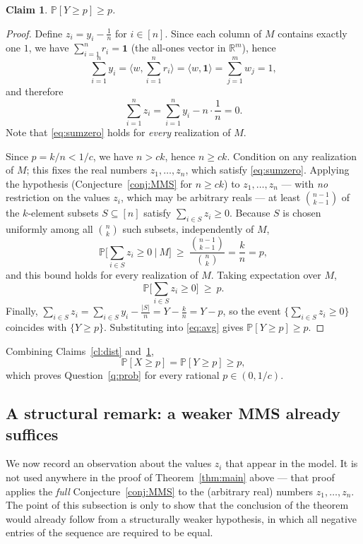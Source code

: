 \documentclass[11pt]{amsart}
\theoremstyle{plain}
\newtheorem{claim}[theorem]{Claim}
\theoremstyle{definition}
\def\bR{\mathbb{R}}
\def\Pb{\mathbb{P}}
\begin{document}
\begin{claim}\label{cl:bound}
$\Pb[Y\ge p]\ge p$.
\end{claim}

\begin{proof}
Define $z_i=y_i-\frac1n$ for $i\in[n]$. Since each column of $M$ contains exactly
one $1$, we have $\sum_{i=1}^n r_i=\mathbf 1$ (the all-ones vector in
$\bR^m$), hence
\[
\sum_{i=1}^n y_i=\Big\langle w,\sum_{i=1}^n r_i\Big\rangle
=\langle w,\mathbf 1\rangle=\sum_{j=1}^m w_j=1,
\]
and therefore
\begin{equation}\label{eq:sumzero}
\sum_{i=1}^n z_i=\sum_{i=1}^n y_i-n\cdot\frac1n=0 .
\end{equation}
Note that \eqref{eq:sumzero} holds for \emph{every} realization of $M$.

Since $p=k/n<1/c$, we have $n>ck$, hence $n\ge ck$. Condition on any realization
of $M$; this fixes the real numbers $z_1,\dots,z_n$, which satisfy
\eqref{eq:sumzero}. Applying the hypothesis (Conjecture~\ref{conj:MMS} for
$n\ge ck$) to $z_1,\dots,z_n$ --- with \emph{no} restriction on the values
$z_i$, which may be arbitrary reals --- at least $\binom{n-1}{k-1}$ of the
$k$-element subsets $S\subseteq[n]$ satisfy $\sum_{i\in S}z_i\ge0$. Because $S$ is
chosen uniformly among all $\binom{n}{k}$ such subsets, independently of $M$,
\[
\Pb\Big[\textstyle\sum_{i\in S}z_i\ge0 \ \Big|\ M\Big]
\ \ge\ \frac{\binom{n-1}{k-1}}{\binom{n}{k}}
=\frac{k}{n}=p ,
\]
and this bound holds for every realization of $M$. Taking expectation over $M$,
\begin{equation}\label{eq:avg}
\Pb\Big[\textstyle\sum_{i\in S}z_i\ge0\Big]\ \ge\ p .
\end{equation}
Finally, $\sum_{i\in S}z_i=\sum_{i\in S}y_i-\frac{|S|}{n}=Y-\frac{k}{n}=Y-p$, so
the event $\{\sum_{i\in S}z_i\ge0\}$ coincides with $\{Y\ge p\}$. Substituting
into \eqref{eq:avg} gives $\Pb[Y\ge p]\ge p$.
\end{proof}

Combining Claims~\ref{cl:dist} and~\ref{cl:bound},
\[
\Pb[X\ge p]=\Pb[Y\ge p]\ge p ,
\]
which proves Question~\ref{q:prob} for every rational $p\in(0,1/c)$.

\subsection{A structural remark: a weaker MMS already suffices}

We now record an observation about the values $z_i$ that appear in the model. It is
not used anywhere in the proof of Theorem~\ref{thm:main} above --- that proof
applies the \emph{full} Conjecture~\ref{conj:MMS} to the (arbitrary real) numbers
$z_1,\dots,z_n$. The point of this subsection is only to show that the conclusion of
the theorem would already follow from a structurally weaker hypothesis, in which
all negative entries of the sequence are required to be equal.
\end{document}

